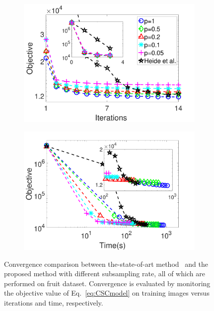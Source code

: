 \begin{figure}[h]
\centering
\begin{subfigure}{0.45\textwidth}
  \includegraphics[width=1\linewidth]{figure/iteVSobj.pdf}
\end{subfigure}

\begin{subfigure}{0.45\textwidth}
  \includegraphics[width=1\linewidth]{figure/timeVSobj.pdf}
  \vspace*{1mm}
\end{subfigure}

\caption{Convergence comparison between the-state-of-art method~\cite{heide2015fast} and the proposed method with different subsampling rate, all of which are performed on fruit dataset. Convergence is evaluated by monitoring the objective value of Eq.~\ref{eq:CSCmodel} on training images versus iterations and time, respectively.}
\label{fig:subsampleResult}
\end{figure}


